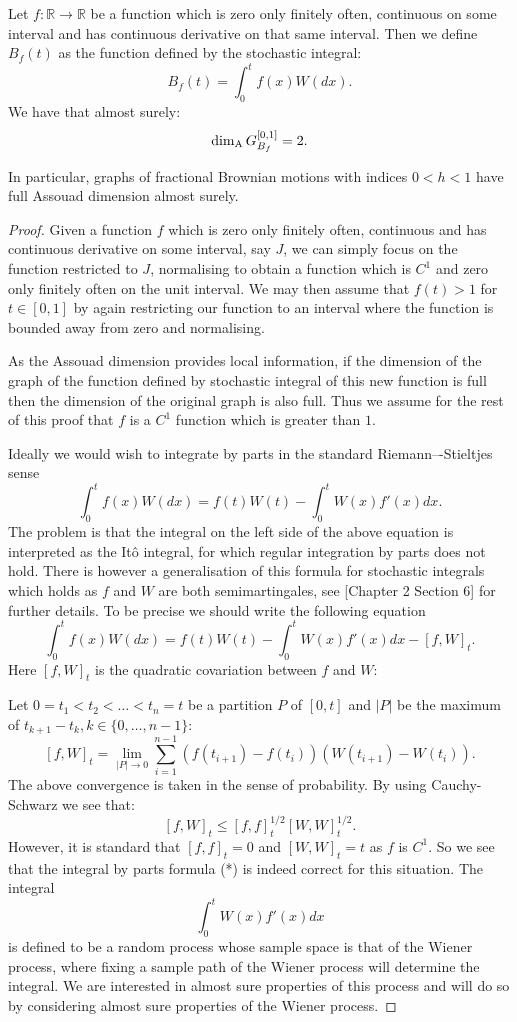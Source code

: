 \begin{thm}
	Let $f:\mathbb{R}\to\mathbb{R}$ be a function which is zero only finitely often, continuous on some interval and has continuous derivative on that same interval. Then we define $B_f(t)$ as the function defined by the stochastic integral:
	\[	
	B_f(t)=\int_0^t f(x) W(dx).
	\]
	We have that almost surely:
	\[
	\dim_{\mathrm{A}} G_{B_f}^{[0,1]}=2.
	\]
\end{thm}
\begin{rem}
	In particular, graphs of fractional Brownian motions with indices $0<h<1$ have full Assouad dimension almost surely.
\end{rem}
\begin{proof}
	Given a function $f$ which is zero only finitely often, continuous and has continuous derivative on some interval, say $J$, we can simply focus on the function restricted to $J$, normalising to obtain a function which is $C^1$ and zero only finitely often on the unit interval. We may then assume that $f(t)>1$ for $t\in [0,1]$ by again restricting our function to an interval where the function is bounded away from zero and normalising. 
	
	As the Assouad dimension provides local information, if the dimension of the graph of the function defined by stochastic integral of this new function is full then the dimension of the original graph is also full. Thus we assume for the rest of this proof that $f$ is a $C^1$ function which is greater than $1$.
	
	Ideally we would wish to integrate by parts in the standard Riemann–-Stieltjes sense
	\[
	\int_{0}^{t}f(x)W(dx)=f(t)W(t)-\int_{0}^{t}W(x)f'(x)dx.\tag{*}
	\]
	The problem is that the integral on the left side of the above equation is interpreted as the It\^{o} integral, for which regular integration by parts does not hold. There is however a generalisation of this formula for stochastic integrals which holds as $f$ and $W$ are both semimartingales, see \cite{Pr}[Chapter 2 Section 6] for further details. To be precise we should write the following equation
	\[
	\int_{0}^{t}f(x)W(dx)=f(t)W(t)-\int_{0}^{t}W(x)f'(x)dx-[f,W]_t.
	\]
	Here $[f,W]_t$ is the quadratic covariation between $f$ and $W$:
	
	Let $0=t_1<t_2<\dots<t_n=t$ be a partition $P$ of $[0,t]$ and $\vert P \vert$ be the maximum of $t_{k+1}-t_k,k\in\{0,\dots,n-1\}$:
	\[
	[f,W]_t=\lim_{\vert P\vert\to 0} \sum_{i=1}^{n-1} (f(t_{i+1})-f(t_{i}))(W(t_{i+1})-W(t_i)).
	\]
	The above convergence is taken in the sense of probability. By using Cauchy-Schwarz we see that:
	\[
	[f,W]_t\leq [f,f]^{1/2}_t[W,W]^{1/2}_t.
	\]
	However, it is standard that $[f,f]_t=0$ and $[W,W]_t=t$ as $f$ is $C^1$. So we see that the integral by parts formula (*) is indeed correct for this situation. The integral 
	\[
	\int_0^{t} W(x)f'(x)dx
	\]
	is defined to be a random process whose sample space is that of the Wiener process, where fixing a sample path of the Wiener process will determine the integral. We are interested in almost sure properties of this process and will do so by considering almost sure properties of the Wiener process.
	

\end{proof}
